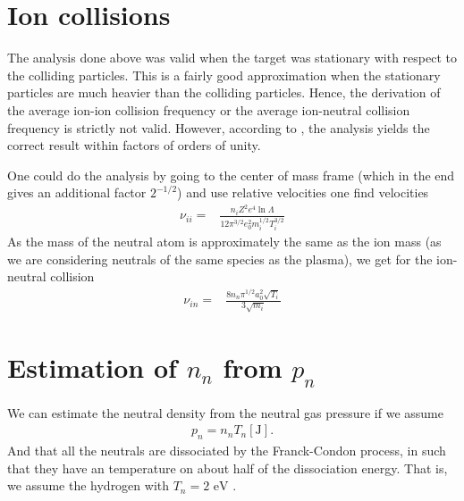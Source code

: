 \section{Ion collisions}
\label{sec:nui}
%
The analysis done above was valid when the target was stationary with respect to the colliding particles.
This is a fairly good approximation when the stationary particles are much heavier than the colliding particles.
Hence, the derivation of the average ion-ion collision frequency or the average ion-neutral collision frequency is strictly not valid.
However, according to \cite{Goldston1995book}, the analysis yields the correct result within factors of orders of unity.

One could do the analysis by going to the center of mass frame (which in the end gives an additional factor $2^{-1/2}$) and use relative velocities one find velocities
%
\begin{align*}
    \nu_{ii}
    =&
    \frac{n_iZ^2e^4\ln\Lambda}{12\pi^{3/2}e_0^2m_i^{1/2}T_i^{3/2}}
\end{align*}
%
As the mass of the neutral atom is approximately the same as the ion mass (as we are considering neutrals of the same species as the plasma), we get for the ion-neutral collision
%
\begin{align*}
    \nu_{in}
    =&
    \frac{8 n_n\pi^{1/2} a_0^2 \sqrt{T_i}}{3\sqrt{m_i}}
\end{align*}

\section{Estimation of \texorpdfstring{$n_n$}{the neutral density} from \texorpdfstring{$p_n$}{the neutral pressure}}
We can estimate the neutral density from the neutral gas pressure if we assume
%
\begin{align*}
    p_n = n_nT_{n}[\text{J}].
\end{align*}
%
And that all the neutrals are dissociated by the Franck-Condon process, in such that they have an temperature on about half of the dissociation energy.
That is, we assume the hydrogen with $T_n = 2 \text{ eV}$ \cite{Stangeby2000book,Janev1987book}.

